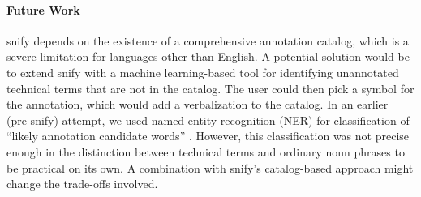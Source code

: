 \documentclass[runningheads]{llncs}
\newcommand\snify{\textsf{snify}\xspace}
\begin{document}
\paragraph{Future Work}
\snify depends on the existence of a comprehensive annotation catalog,
which is a severe limitation for languages other than English.
A potential solution would be to extend \snify with a machine
learning-based tool for identifying unannotated technical terms that are not in the
catalog.  The user could then pick a symbol for the annotation, which would add a
verbalization to the catalog.  In an earlier (pre-\snify) attempt, we used named-entity
recognition (NER) for classification of ``likely annotation candidate words''
\cite{hutterer:msc23}. However, this classification was not precise enough in the
distinction between technical terms and ordinary noun phrases to be practical on
its own.  A combination with \snify's catalog-based approach might change the trade-offs
involved.







\printbibliography
\end{document}

